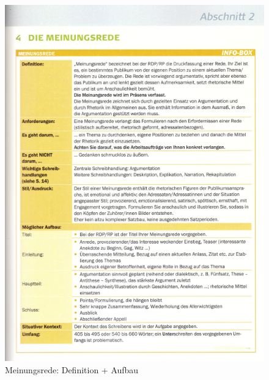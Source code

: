 \begin{figure}[h]
    \centering
    \includegraphics[scale=0.8]{pics/Screenshot from 2023-02-06 12-29-34.png}
    \caption{Meinungsrede: Definition + Aufbau}
    \label{fig:impl:Meinungsrede1}
\end{figure}

